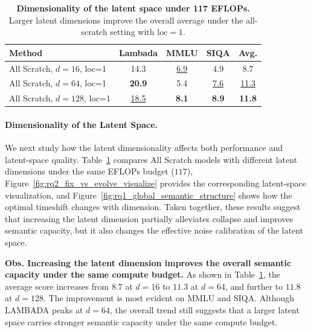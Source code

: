 \begin{table}
    \vspace{-0.8em}
    \centering
    \caption{\textbf{Dimensionality of the latent space under 117 EFLOPs.} Larger latent dimensions improve the overall average under the all-scratch setting with $\mathrm{loc}=1$.}
    \label{tab:latent_dim_half}
    \small
    \setlength{\tabcolsep}{3.5pt}
    \renewcommand{\arraystretch}{1.08}
    \begin{tabular}{lcccc}
        \toprule
        Method & Lambada & MMLU & SIQA & Avg. \\
        \midrule
        All Scratch, $d=16$, loc=1  & 14.3 & \underline{6.9} & 4.9 & 8.7 \\
        All Scratch, $d=64$, loc=1  & \textbf{20.9} & 5.4 & \underline{7.6} & \underline{11.3} \\
        All Scratch, $d=128$, loc=1 & \underline{18.5} & \textbf{8.1} & \textbf{8.9} & \textbf{11.8} \\
        \bottomrule
    \end{tabular}
    \vspace{-0.8em}
\end{table}

\paragraph{Dimensionality of the Latent Space. }
We next study how the latent dimensionality affects both performance and latent-space quality. Table~\ref{tab:latent_dim_half} compares All Scratch models with different latent dimensions under the same EFLOPs budget ($117$), Figure~\ref{fig:rq2_fix_vs_evolve_visualize} provides the corresponding latent-space visualization, and Figure~\ref{fig:rq1_global_semantic_structure} shows how the optimal timeshift changes with dimension. Taken together, these results suggest that increasing the latent dimension partially alleviates collapse and improves semantic capacity, but it also changes the effective noise calibration of the latent space.

\textbf{Obs.  Increasing the latent dimension improves the overall semantic capacity under the same compute budget.}
As shown in Table~\ref{tab:latent_dim_half}, the average score increases from $8.7$ at $d=16$ to $11.3$ at $d=64$, and further to $11.8$ at $d=128$. The improvement is most evident on MMLU and SIQA. Although LAMBADA peaks at $d=64$, the overall trend still suggests that a larger latent space carries stronger semantic capacity under the same compute budget.

